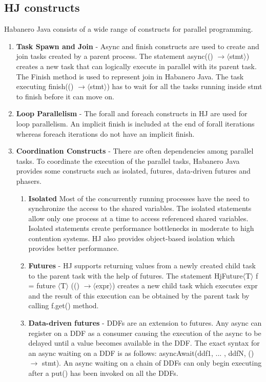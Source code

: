 \subsection{HJ constructs}
Habanero Java consists of a wide range of constructs for parallel programming.
\begin{enumerate}
\item \textbf{Task Spawn and Join} - Async and finish constructs are used to create and join tasks created by a parent process. The statement async(() $ \rightarrow \langle$stmt$\rangle$) creates a new task that can logically execute in parallel with its parent task. The Finish method is used to represent join in Habanero Java. The task executing finish(() $ \rightarrow \langle$stmt$\rangle$) has to wait for all the tasks running inside stmt to finish before it can move on.
\item \textbf{Loop Parallelism} - The forall and foreach constructs in HJ are used for loop parallelism. An implicit finish is included at the end of forall iterations whereas foreach iterations do not have an implicit finish. 
\item \textbf{Coordination Constructs} - There are often dependencies among parallel tasks. To coordinate the execution of the parallel tasks, Habanero Java provides some constructs such as isolated, futures, data-driven futures and phasers.
\begin{enumerate}
\item \textbf{Isolated}
Most of the concurrently running processes have the need to synchronize the access to the shared variables. The isolated statements allow only one process at a time to access referenced shared variables. Isolated statements create performance bottlenecks in moderate to high contention systems. HJ also provides object-based isolation which provides better performance.
\item \textbf{Futures} - HJ supports returning values from a newly created child task to the parent task with the help of futures. The statement HjFuture$\langle$T$\rangle$ f = future $\langle$T$\rangle$ (() $ \rightarrow \langle$expr$\rangle$) creates a new child task which executes expr and the result of this execution can be obtained by the parent task by calling f.get() method.
\item \textbf{Data-driven futures} - DDFs are an extension to futures. Any async can register on a DDF as a consumer causing the execution of the async to be delayed until a value becomes available in the DDF. The exact syntax for an async waiting on a DDF is as follows: asyncAwait(ddf1, ... , ddfN, () $\rightarrow$ stmt). An async waiting on a chain of DDFs can only begin executing after a put() has been invoked on all the DDFs.

\end{enumerate}
\end{enumerate}
